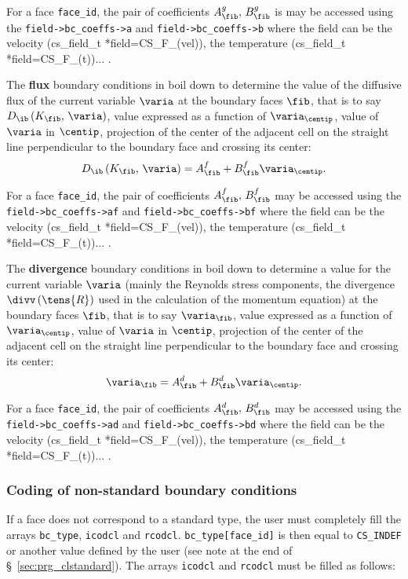 For a face \texttt{face\_id}, the pair of coefficients $A_{\fib}^g , \, B_{\fib}^g$ is
may be accessed using the \texttt{field->bc\_coeffs->a} and
\texttt{field->bc\_coeffs->b} where the field can be the velocity (cs\_field\_t *field=CS\_F\_(vel)),
the temperature (cs\_field\_t *field=CS\_F\_(t))... .

The \textbf{flux} boundary conditions in \CS boil down to determine the
value of the diffusive flux of the
current variable $\varia$ at the boundary faces $\fib$, that is to say
 $D_{\ib} \left(K_\fib, \, \varia \right)$,
value expressed as a function of $\varia_{\centip}$, value of $\varia$ in $\centip$,
projection of the center of the adjacent cell on the straight line
perpendicular to the boundary face and crossing its center:
\begin{equation}
D_{\ib} \left(K_\fib, \, \varia \right) = A_{\fib}^f +B_{\fib}^f \varia_{\centip}.
\end{equation}

For a face \texttt{face\_id}, the pair of coefficients $A_{\fib}^f , \, B_{\fib}^f$
may be accessed using the \texttt{field->bc\_coeffs->af} and
\texttt{field->bc\_coeffs->bf} where the field can be the velocity (cs\_field\_t *field=CS\_F\_(vel)),
the temperature (cs\_field\_t *field=CS\_F\_(t))... .

The \textbf{divergence} boundary conditions in \CS boil down to determine a value for the
current variable $\varia$ (mainly the Reynolds stress components, the divergence $\divv \left(\tens{R} \right)$ used in the calculation of the momentum equation) at the boundary
faces $\fib$, that is to say $\varia_\fib$,
value expressed as a function of $\varia_{\centip}$, value of $\varia$ in $\centip$,
projection of the center of the adjacent cell on the straight line
perpendicular to the boundary face and crossing its center:
\begin{equation}
\varia_\fib=A_{\fib}^d +B_{\fib}^d \varia_{\centip}.
\end{equation}

For a face \texttt{face\_id}, the pair of coefficients $A_{\fib}^d , \, B_{\fib}^d$
may be accessed using the \texttt{field->bc\_coeffs->ad} and
\texttt{field->bc\_coeffs->bd} where the field can be the velocity
(cs\_field\_t *field=CS\_F\_(vel)), the temperature (cs\_field\_t *field=CS\_F\_(t))... .

\subsubsection{Coding of non-standard boundary conditions}
\label{sec:prg_clnonstandard}%
If a face does not correspond to a standard type, the user
must completely fill the arrays \texttt{bc\_type}, \texttt{icodcl} and
\texttt{rcodcl}. \texttt{bc\_type[face\_id]} is then equal to \texttt{CS\_INDEF}
or another value defined by the user (see note at the end of
\S~\ref{sec:prg_clstandard}). The arrays \texttt{icodcl} and \texttt{rcodcl}
must be filled as follows:


